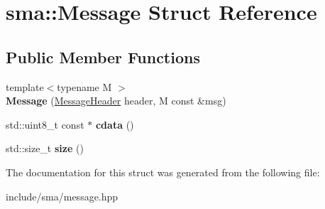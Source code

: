\hypertarget{structsma_1_1Message}{\section{sma\-:\-:Message Struct Reference}
\label{structsma_1_1Message}
}
\subsection*{Public Member Functions}
\begin{DoxyCompactItemize}
\item 
\hypertarget{structsma_1_1Message_a65c46931c395532a94aa70894745f624}{{\footnotesize template$<$typename M $>$ }\\{\bfseries Message} (\hyperlink{structsma_1_1MessageHeader}{Message\-Header} header, M const \&msg)}\label{structsma_1_1Message_a65c46931c395532a94aa70894745f624}

\item 
\hypertarget{structsma_1_1Message_a47174b68653e8860dd2a6623dda3ef82}{std\-::uint8\-\_\-t const $\ast$ {\bfseries cdata} ()}\label{structsma_1_1Message_a47174b68653e8860dd2a6623dda3ef82}

\item 
\hypertarget{structsma_1_1Message_a47eda10f28a3804372f6a59847271c1a}{std\-::size\-\_\-t {\bfseries size} ()}\label{structsma_1_1Message_a47eda10f28a3804372f6a59847271c1a}

\end{DoxyCompactItemize}


The documentation for this struct was generated from the following file\-:\begin{DoxyCompactItemize}
\item 
include/sma/message.\-hpp\end{DoxyCompactItemize}
